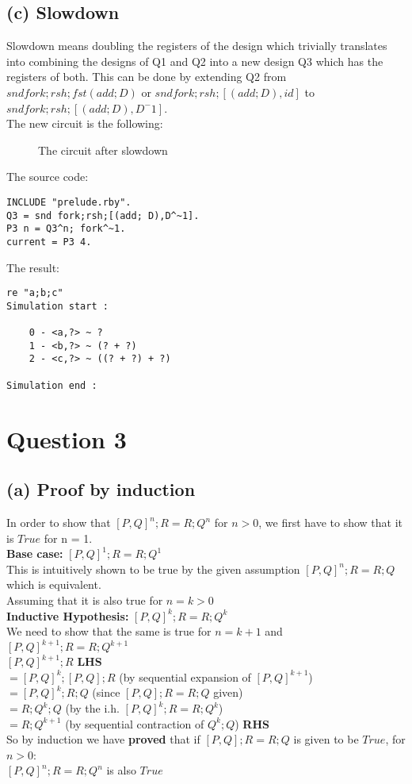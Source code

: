 \documentclass[a4paper,10pt]{article}
\begin{document}
\subsection*{(c) Slowdown}
Slowdown means doubling the registers of the design which trivially translates into combining the designs of Q1 and Q2 into a new design Q3 which has the registers of both.
This can be done by extending Q2 from $snd fork;rsh;fst (add; D)$ or $snd fork;rsh;[(add; D),id]$ to $snd fork;rsh;[(add; D),D^-1]$.\\[0.5cm]
The new circuit is the following:
\begin{figure}[H]
\begin{center}

\caption{The circuit after slowdown}
\end{center}
\end{figure}
The source code:
\begin{Verbatim}
INCLUDE "prelude.rby".
Q3 = snd fork;rsh;[(add; D),D^~1].
P3 n = Q3^n; fork^~1. 
current = P3 4.
\end{Verbatim}
The result:
\begin{Verbatim}
re "a;b;c"
Simulation start :

    0 - <a,?> ~ ?
    1 - <b,?> ~ (? + ?)
    2 - <c,?> ~ ((? + ?) + ?)

Simulation end :
\end{Verbatim}
\section*{Question 3}
\subsection*{(a) Proof by induction}
In order to show that $[P,Q]^{n};R = R;Q^n$ for $n>0$, we first have to show that it is $True$ for n = 1.
\\[0.5cm]
\textbf{Base case:} $[P,Q]^{1};R=R;Q^1$
\\[0.5cm]
This is intuitively shown to be true by the given assumption $[P,Q]^{n};R=R;Q$ which is equivalent.
\\[0.5cm]
Assuming that it is also true for  $n = k > 0$ 
\\[0.5cm]
\textbf{Inductive Hypothesis:} $[P,Q]^{k};R = R;Q^k$
\\[0.5cm]
We need to show that the same is true for $n = k+1$ and $[P,Q]^{k+1};R = R;Q^{k+1}$
\\[0.5cm]
 $[P,Q]^{k+1};R $ \textbf{LHS}
\\[0.25cm]
$= [P,Q]^k;[P,Q];R$ (by sequential expansion of $[P,Q]^{k+1}$)
\\[0.25cm]
$= [P,Q]^k;R;Q$ (since $[P,Q];R = R;Q$ given)
\\[0.25cm]
$= R;Q^k;Q$ (by the i.h. $[P,Q]^{k};R = R;Q^k$)
\\[0.25cm]
$= R;Q^{k+1}$ (by sequential contraction of $Q^{k};Q$)  \textbf{RHS}
\\[0.5cm]
So by induction we have \textbf{proved} that if $[P,Q];R = R;Q$ is given to be $True$, for $n>0$:
\\[0.5cm]
$[P,Q]^{n};R = R;Q^n$ 
is also $True$
\end{document}
